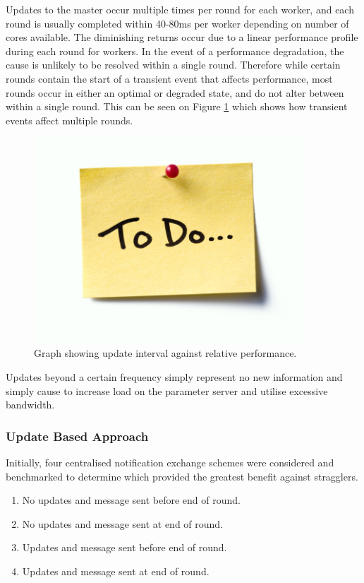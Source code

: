 \documentclass[12pt]{article}
\begin{document}
Updates to the master occur multiple times per round for each worker, and each round is usually completed within 40-80ms per worker depending on number of cores available. The diminishing returns occur due to a linear performance profile during each round for workers. In the event of a performance degradation, the cause is unlikely to be resolved within a single round. Therefore while certain rounds contain the start of a transient event that affects performance, most rounds occur in either an optimal or degraded state, and do not alter between within a single round. This can be seen on Figure \ref{RoundDegradation} which shows how transient events affect multiple rounds.

\begin{figure}[H]
  \centering
  \includegraphics[width=4in]{todo}
  \caption[]{Graph showing update interval against relative performance.}
  \label{RoundDegradation}
\end{figure}

Updates beyond a certain frequency simply represent no new information and simply cause to increase load on the parameter server and utilise excessive bandwidth.

\subsubsection{Update Based Approach}
Initially, four centralised notification exchange schemes were considered and benchmarked to determine which provided the greatest benefit against stragglers.

\begin{enumerate}
\item No updates and message sent before end of round.
\item No updates and message sent at end of round.
\item Updates and message sent before end of round.
\item Updates and message sent at end of round.
\end{enumerate}
\end{document}
